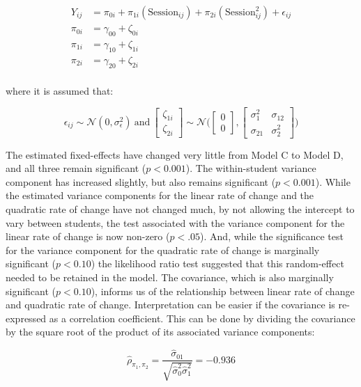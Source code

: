 \documentclass[11pt]{umnthesis}
\begin{document}
\begin{equation}\label{eq:model-d}
\begin{split}
Y_{ij} &= \pi_{0i} + \pi_{1i}(\mathrm{Session}_{ij}) + \pi_{2i}(\mathrm{Session}_{ij}^2) + \epsilon_{ij}\\[2ex]
\pi_{0i} &= \gamma_{00} + \zeta_{0i}\\[1ex]
\pi_{1i} &= \gamma_{10} + \zeta_{1i}\\[1ex]
\pi_{2i} &= \gamma_{20} + \zeta_{2i}\\[1ex]
\end{split}
\end{equation}

where it is assumed that:

\[
\epsilon_{ij} \sim \mathcal{N}(0,\sigma^2_{\epsilon})~\mathrm{and}~\begin{bmatrix}\zeta_{1i} \\ \zeta_{2i}\end{bmatrix} \sim \mathcal{N}\bigg(\begin{bmatrix}0 \\ 0\end{bmatrix},\begin{bmatrix}\sigma^2_{1} & \sigma_{12} \\ \sigma_{21} & \sigma^2_{2}\end{bmatrix}\bigg)
\]

The estimated fixed-effects have changed very little from Model C to Model D,
and all three remain significant (\(p<0.001\)). The within-student variance component has increased slightly, but also remains significant (\(p<0.001\)). While the estimated variance components for the linear rate of change and the quadratic rate of change have not changed much, by not allowing the intercept to vary between students, the test associated with the variance component for the linear rate of change is now non-zero (\(p<.05\)). And, while the significance test for the variance component for the quadratic rate of change is marginally significant (\(p<0.10\)) the likelihood ratio test suggested that this random-effect needed to be retained in the model. The covariance, which is also marginally significant (\(p<0.10\)), informs us of the relationship between linear rate of change and quadratic rate of change. Interpretation can be easier if the covariance is re-expressed as a correlation coefficient. This can be done by dividing the covariance by the square root of the product of its associated variance components:

\begin{equation}\label{eq:corr}
\hat\rho_{\pi_1,\pi_2} = \frac{\hat\sigma_{01}}{\sqrt{\hat\sigma_0^2\hat\sigma_1^2}} = -0.936
\end{equation}
\end{document}
